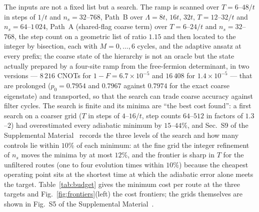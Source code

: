 \documentclass[a4paper,11pt,noarxiv]{quantumarticle}
\newcommand{\SM}{Supplemental Material~\cite{SM}}
\begin{document}
The inputs are not a fixed list but a search.  The ramp is scanned over
$T=6$--$48/t$ in steps of $1/t$ and $n_s=32$--$768$, Path~B over
$\Lambda=8t$, $16t$, $32t$, $T=12$--$32/t$ and $n_s=64$--$1\,024$, Path~A
(shared-flag coarse term) over $T=6$--$24/t$ and $n_s=32$--$768$, the
step count on a geometric list of ratio $1.15$ and then located to the
integer by bisection, each with $M=0,\ldots,6$ cycles, and the adaptive
ansatz at every prefix; the coarse state of the hierarchy is not an oracle
but the state actually prepared by a four-site ramp from the free-fermion
determinant, in two versions --- $8\,216$ CNOTs for $1-F=6.7\times10^{-5}$
and $16\,408$ for $1.4\times10^{-5}$ --- that are prolonged ($p_0=0.7954$
and $0.7967$ against $0.7974$ for the exact coarse eigenstate) and
transported, so that the search can trade coarse accuracy against filter
cycles.  The search is finite and its minima are ``the best cost found'':
a first search on a coarser grid ($T$ in steps of $4$--$16/t$, step
counts $64$--$512$ in factors of $1.3$--$2$) had overestimated every
adiabatic minimum by $15$--$44\%$, and Sec.~S9 of the \SM{} records the
three levels of the search and how many controls lie within $10\%$ of each
minimum: at the fine grid the integer refinement of $n_s$ moves the minima
by at most $12\%$, and the frontier is sharp in $T$ for the unfiltered
routes (one to four evolution times within $10\%$) because the cheapest
operating point sits at the shortest time at which the adiabatic error
alone meets the target.  Table~\ref{tab:budget} gives the minimum cost per
route at the three targets and Fig.~\ref{fig:frontiers}(left) the cost
frontiers; the grids themselves are shown in Fig.~S5 of the \SM{}.
\end{document}
